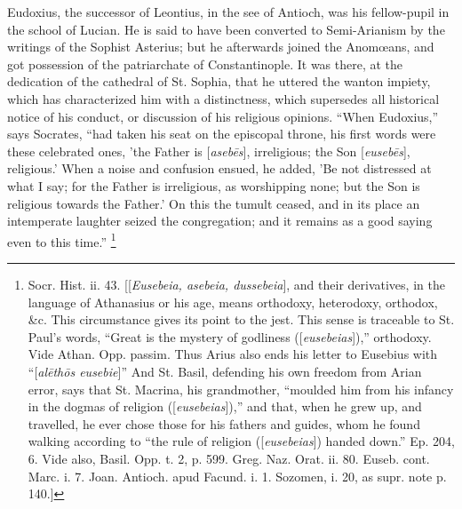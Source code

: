 Eudoxius, the successor of Leontius, in the see of Antioch, was his
fellow-pupil in the school of Lucian. He is said to have been
converted to Semi-Arianism by the writings of the Sophist Asterius;
but he afterwards joined the Anomœans, and got possession of the
patriarchate of Constantinople. It was there, at the dedication of the
cathedral of St. Sophia, that he uttered the wanton impiety, which has
characterized him with a distinctness, which supersedes all historical
notice of his conduct, or discussion of his religious opinions.
``When Eudoxius,'' says Socrates, ``had taken his seat on
the episcopal throne, his first words were these celebrated ones, 'the
Father is [\emph{aseb\={e}s}], irreligious; the Son [\emph{euseb\={e}s}],
religious.' When a noise and confusion ensued, he added, 'Be not
distressed at what I say; for the Father is irreligious, as
worshipping none; but the Son is religious towards the Father.' On
this the tumult ceased, and in its place an intemperate laughter
seized the congregation; and it remains as a good saying even to this
time.'' \footnote{Socr. Hist. ii. 43. [[\emph{Eusebeia, asebeia,
dussebeia}], and their derivatives, in the language of Athanasius
or his age, means orthodoxy, heterodoxy, orthodox, \&c. This
circumstance gives its point to the jest. This sense is traceable to
St. Paul's words, ``Great is the mystery of godliness ([\emph{eusebeias}]),''
orthodoxy. Vide Athan. Opp. passim. Thus Arius also ends his letter to
Eusebius with ``[\emph{al\={e}th\={o}s eusebie}]'' And
St. Basil, defending his own freedom from Arian error, says that St.
Macrina, his grandmother, ``moulded him from his infancy in the
dogmas of religion ([\emph{eusebeias}]),'' and that, when he grew
up, and travelled, he ever chose those for his fathers and guides,
whom he found walking according to ``the rule of religion ([\emph{eusebeias}])
handed down.'' Ep. 204, 6. Vide also, Basil. Opp. t. 2, p. 599.
Greg. Naz. Orat. ii. 80. Euseb. cont. Marc. i. 7. Joan. Antioch. apud
Facund. i. 1. Sozomen, i. 20, as supr. note p. 140.]}

